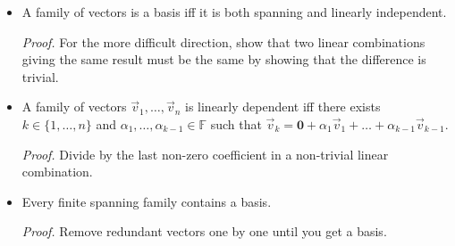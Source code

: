 \documentclass[11pt]{article}
\newcommand{\1}{\mathbf{1}}
\newcommand{\0}{\mathbf{0}}
\newcommand{\vv}{\vec{v}}
\newcommand{\spitem}{\item[$\circ$]}
\begin{document}
\begin{itemize}
\item

A family of vectors is a basis iff it is both spanning and linearly independent.

\emph{Proof.}
For the more difficult direction, show that two linear combinations giving the same result must be the same by showing that the difference is trivial.

\spitem


A family of vectors $\vv_1, \dots, \vv_n$ is linearly dependent iff there exists $k\in\{1,\dots,n\}$ and $\alpha_1,\dots,\alpha_{k-1}\in\mathbb{F}$ such that $\vv_k=\0 + \alpha_1 \vv_1 + \dots + \alpha_{k-1} \vv_{k-1}$.

\emph{Proof.}
Divide by the last non-zero coefficient in a non-trivial linear combination.

% 


\item

Every finite spanning family contains a basis.

\emph{Proof.}
Remove redundant vectors one by one until you get a basis.


\end{itemize}
\end{document}
